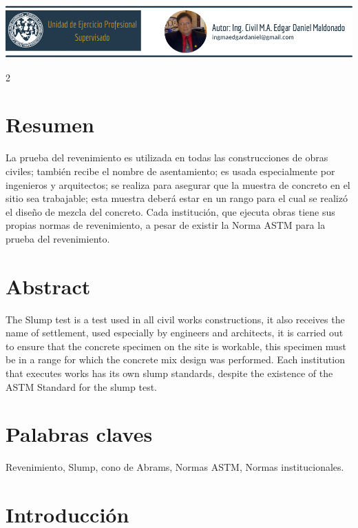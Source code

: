 \documentclass[12pt,spanish,Letterpaper,openany]{book}
\begin{document}
\begin{center}\includegraphics[width=1\linewidth]{images/maldonado} \end{center}

\begin {multicols}{2}

\hypertarget{resumen-11}{%
\section{Resumen}\label{resumen-11}}

La prueba del revenimiento es utilizada en todas las construcciones de obras civiles; también recibe el nombre de asentamiento; es usada especialmente por ingenieros y arquitectos; se realiza para asegurar que la muestra de concreto en el sitio sea trabajable; esta muestra deberá estar en un rango para el cual se realizó el diseño de mezcla del concreto. Cada institución, que ejecuta obras tiene sus propias normas de revenimiento, a pesar de existir la Norma ASTM para la prueba del revenimiento.

\hypertarget{abstract-9}{%
\section{Abstract}\label{abstract-9}}

The Slump test is a test used in all civil works constructions, it also receives the name of settlement, used especially by engineers and architects, it is carried out to ensure that the concrete specimen on the site is workable, this specimen must be in a range for which the concrete mix design was performed. Each institution that executes works has its own slump standards, despite the existence of the ASTM Standard for the slump test.

\hypertarget{palabras-claves-11}{%
\section{Palabras claves}\label{palabras-claves-11}}

Revenimiento, Slump, cono de Abrams, Normas ASTM, Normas institucionales.

\hypertarget{introducciuxf3n-11}{%
\section{Introducción}\label{introducciuxf3n-11}}


\end{multicols}
\end{document}
